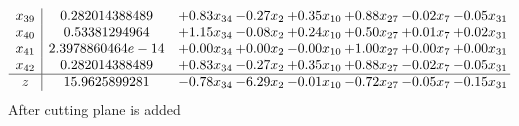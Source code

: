 \documentclass[8pt]{article}
\begin{document}
\[\begin{array}{c| c c@{\hskip 2pt} c@{\hskip 2pt} c@{\hskip 2pt} c@{\hskip 2pt} c@{\hskip 2pt} c@{\hskip 2pt} }
 x_{39}   &  0.282014388489 & +  0.83 x_{34} & -0.27 x_{2} & +  0.35 x_{10} & +  0.88 x_{27} & -0.02 x_{7} & -0.05 x_{31}\\
 x_{40}   &  0.53381294964 & +  1.15 x_{34} & -0.08 x_{2} & +  0.24 x_{10} & +  0.50 x_{27} & +  0.01 x_{7} & +  0.02 x_{31}\\
 x_{41}   &  2.3978860464e-14 & +  0.00 x_{34} & +  0.00 x_{2} & -0.00 x_{10} & +  1.00 x_{27} & +  0.00 x_{7} & +  0.00 x_{31}\\
 x_{42}   &  0.282014388489 & +  0.83 x_{34} & -0.27 x_{2} & +  0.35 x_{10} & +  0.88 x_{27} & -0.02 x_{7} & -0.05 x_{31}\\
\hline
z    &  15.9625899281 & -0.78 x_{34} & -6.29 x_{2} & -0.01 x_{10} & -0.72 x_{27} & -0.05 x_{7} & -0.15 x_{31}\\
\end{array}\]
 After cutting plane is added 
\end{document}
